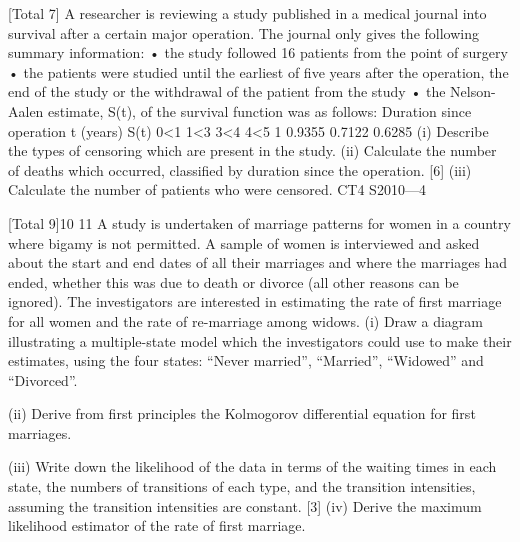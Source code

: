 \documentclass[a4paper,12pt]{article}
\begin{document}
\begin{enumerate}


[Total 7]
A researcher is reviewing a study published in a medical journal into survival after a
certain major operation. The journal only gives the following summary information:
• the study followed 16 patients from the point of surgery
• the patients were studied until the earliest of five years after the operation, the end
of the study or the withdrawal of the patient from the study
• the Nelson-Aalen estimate, S(t), of the survival function was as follows:
Duration since operation t (years) S(t)
0\leqt<1
1\leqt<3
3\leqt<4
4\leqt<5 1
0.9355
0.7122
0.6285
(i) Describe the types of censoring which are present in the study.
(ii) Calculate the number of deaths which occurred, classified by duration since
the operation.
[6]
(iii) Calculate the number of patients who were censored.
CT4 S2010—4


[Total 9]10
11
A study is undertaken of marriage patterns for women in a country where bigamy is
not permitted. A sample of women is interviewed and asked about the start and end
dates of all their marriages and where the marriages had ended, whether this was due
to death or divorce (all other reasons can be ignored). The investigators are interested
in estimating the rate of first marriage for all women and the rate of re-marriage
among widows.
(i) Draw a diagram illustrating a multiple-state model which the investigators
could use to make their estimates, using the four states: “Never married”,
“Married”, “Widowed” and “Divorced”.

(ii) Derive from first principles the Kolmogorov differential equation for first
marriages.

(iii) Write down the likelihood of the data in terms of the waiting times in each
state, the numbers of transitions of each type, and the transition intensities,
assuming the transition intensities are constant.
[3]
(iv) Derive the maximum likelihood estimator of the rate of first marriage.






\end{enumerate}
\end{document}
